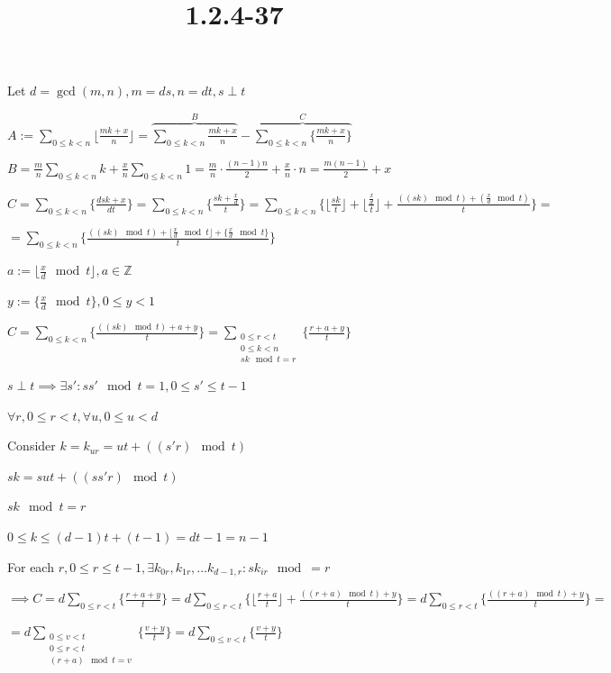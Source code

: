 \documentclass{article}
\title{1.2.4-37}
\begin{document}
\maketitle

Let $d = \gcd(m,n), m = ds, n = dt, s \perp t$

$A := \sum_{0 \leq k < n} \lfloor \frac{mk+x}{n} \rfloor = \overbrace{\sum_{0 \leq k < n} \frac{mk+x}{n}}^B - \overbrace{\sum_{0 \leq k < n} \{ \frac{mk+x}{n} \}}^C$

$B = \frac{m}{n} \sum_{0\leq k < n} k + \frac{x}{n} \sum_{0\leq k < n} 1 = \frac{m}{n}\cdot \frac{(n-1)n}{2} + \frac{x}{n}\cdot n = \frac{m(n-1)}{2} + x$

$C = \sum_{0\leq k < n} \{ \frac{dsk+x}{dt} \} = \sum_{0\leq k < n} \{ \frac{sk+\frac{x}{d}}{t} \} = \sum_{0\leq k < n} \{ \lfloor \frac{sk}{t} \rfloor + \lfloor \frac{\frac{x}{d}}{t} \rfloor + \frac{((sk) \mod t) + (\frac{x}{d} \mod t)}{t} \} =$

$= \sum_{0\leq k < n} \{ \frac{((sk) \mod t) + \lfloor \frac{x}{d} \mod t \rfloor + \{ \frac{x}{d} \mod t \} }{t} \}$

$a := \lfloor \frac{x}{d} \mod t \rfloor, a \in \mathbb{Z}$

$y := \{ \frac{x}{d} \mod t \}, 0 \leq y < 1$

$C = \sum_{0\leq k < n} \{ \frac{((sk) \mod t) + a + y }{t} \} = \sum_{\substack{0\leq r < t\\0 \leq k < n \\ sk \mod t = r}} \{ \frac{r + a + y }{t} \}$

$s \perp t \implies \exists s': ss' \mod t = 1, 0 \leq s' \leq t - 1$

$\forall r, 0 \leq r < t, \forall u, 0 \leq u < d$

Consider $k = k_{ur} = ut + ((s'r) \mod t)$

$sk = sut + ((ss'r) \mod t)$

$sk \mod t = r$

$0 \leq k \leq (d-1)t + (t-1) = dt - 1 = n - 1$

For each $r, 0 \leq r \leq t - 1, \exists k_{0r}, k_{1r}, \ldots k_{d-1,r}: sk_{ir} \mod = r$

$\implies C = d\sum_{0 \leq r < t} \{ \frac{r + a + y }{t} \} = d\sum_{0 \leq r < t} \{ \lfloor \frac{r+a}{t} \rfloor + \frac{((r + a) \mod t)  + y }{t} \} = d\sum_{0 \leq r < t} \{ \frac{((r + a) \mod t)  + y }{t} \} =$

$= d\sum_{\substack{0 \leq v < t \\ 0 \leq r < t \\ (r + a) \mod t = v}} \{ \frac{v + y}{t} \} = d\sum_{0 \leq v < t} \{ \frac{v + y}{t} \}$
\end{document}
